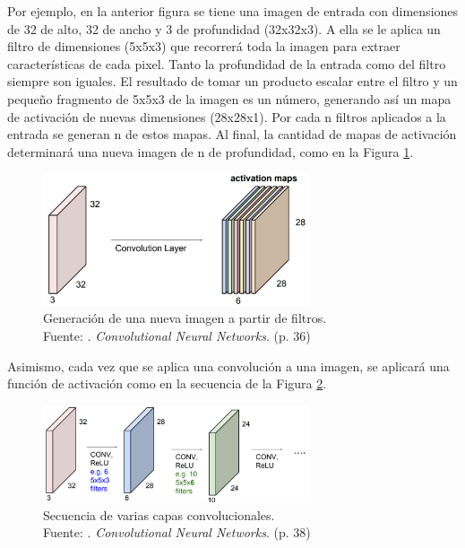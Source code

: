 \begin{itemize}
\begin{itemize}
\begin{itemize}
			Por ejemplo, en la anterior figura se tiene una imagen de entrada con dimensiones de 32 de alto, 32 de ancho y 3 de profundidad (32x32x3). A ella se le aplica un filtro de dimensiones (5x5x3) que recorrerá toda la imagen para extraer características de cada pixel. Tanto la profundidad de la entrada como del filtro siempre son iguales. El resultado de tomar un producto escalar entre el filtro y un pequeño fragmento de 5x5x3 de la imagen es un número, generando así un mapa de activación de nuevas dimensiones (28x28x1). Por cada n filtros aplicados a la entrada se generan n de estos mapas. Al final, la cantidad de mapas de activación determinará una nueva imagen de n de profundidad, como en la Figura \ref{2:fig27}.
			\begin{figure}[h]
				\begin{center}
					\includegraphics[width=0.70\textwidth]{2/figures/filtros_cnn.jpg}
					\caption[Generación de una nueva imagen a partir de filtros]{Generación de una nueva imagen a partir de filtros.\\
					Fuente: \cite{tec_li2019cnn}. \textit{Convolutional Neural Networks}. (p. 36)}
					\label{2:fig27}
				\end{center}
			\end{figure}
			
			Asimismo, cada vez que se aplica una convolución a una imagen, se aplicará una función de activación como en la secuencia de la Figura \ref{2:fig28}.
			\begin{figure}[h]
				\begin{center}
					\includegraphics[width=0.70\textwidth]{2/figures/capas_cnn.jpg}
					\caption[Secuencia de varias capas convolucionales]{Secuencia de varias capas convolucionales.\\
					Fuente: \cite{tec_li2019cnn}. \textit{Convolutional Neural Networks}. (p. 38)}
					\label{2:fig28}
				\end{center}
			\end{figure}
			

\end{itemize}
\end{itemize}
\end{itemize}

